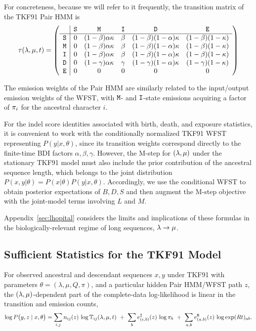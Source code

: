 For concreteness, because we will refer to it frequently, the transition matrix of the TKF91 Pair HMM is
\[
\tau(\lambda,\mu,t) =
\left(
    \begin{array}{r|ccccc}
    & {\tt S} & {\tt M} & {\tt I} & {\tt D} & {\tt E} \\
    \hline
    {\tt S} & 0 & (1-\beta)\alpha\kappa & \beta & (1-\beta)(1-\alpha)\kappa & (1-\beta)(1-\kappa) \\
    {\tt M} & 0 & (1-\beta)\alpha\kappa & \beta & (1-\beta)(1-\alpha)\kappa & (1-\beta)(1-\kappa) \\
    {\tt I} & 0 & (1-\beta)\alpha\kappa & \beta & (1-\beta)(1-\alpha)\kappa & (1-\beta)(1-\kappa) \\
    {\tt D} & 0 & (1-\gamma)\alpha\kappa & \gamma & (1-\gamma)(1-\alpha)\kappa & (1-\gamma)(1-\kappa) \\
    {\tt E} & 0 & 0 & 0 & 0 & 0
    \end{array}
\right)
\]

The emission weights of the Pair HMM are similarly related to the input/output emission weights of the WFST, with ${\tt M}$- and ${\tt I}$-state emissions acquiring a factor of $\pi_i$ for the ancestral character $i$.

For the indel score identities associated with birth, death, and exposure statistics, it is convenient to work with the conditionally normalized TKF91 WFST representing $P(y|x,\theta)$, since its transition weights correspond directly to the finite-time BDI factors
$\alpha,\beta,\gamma$.
However, the M-step for $(\lambda,\mu)$ under the stationary TKF91 model must also include the prior contribution of the ancestral sequence length, which belongs to the joint distribution
$P(x,y|\theta) = P(x|\theta) P(y|x,\theta)$.
Accordingly, we use the conditional WFST to obtain posterior expectations of $B,D,S$ and then augment the M-step objective with the joint-model terms involving
$L$ and $M$.

Appendix~\ref{sec:lhopital} considers the limits and implications of these formulas in the biologically-relevant regime of long sequences, $\lambda \to \mu$.

\subsection{Sufficient Statistics for the TKF91 Model}

For observed ancestral and descendant sequences $x,y$ under TKF91 with parameters
$\theta=(\lambda,\mu,Q,\pi)$, and a particular hidden Pair HMM/WFST path $z$,
the $(\lambda,\mu)$-dependent part of the complete-data log-likelihood is linear in the transition and emission counts,
\[
\log P\bigl(y,z \mid x, \theta\bigr)
=
\sum_{i,j} n_{ij}(z)\,\log \mathbb{T}_{ij}(\lambda,\mu,t)
\ +\ \sum_b e^{{\tt I}}_{(\epsilon,b)}(z)\,\log \pi_b
\ +\ \sum_{a,b} e^{{\tt M}}_{(a,b)}(z)\,\log \exp(R t)_{ab}.
\]

